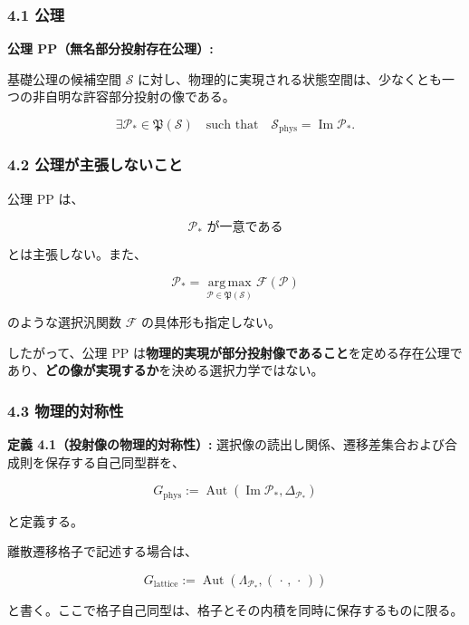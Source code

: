 \documentclass[
  a4paper,
  ja=minimal,
  xelatex,
  paragraph-mark={},
]{bxjsarticle}
\begin{document}
\subsubsection{4.1 公理}\label{ux516cux7406}

\textbf{公理 PP（無名部分投射存在公理）:}

基礎公理の候補空間 \(\mathscr S\)
に対し、物理的に実現される状態空間は、少なくとも一つの非自明な許容部分投射の像である。

\[
\boxed{
\exists\mathcal P_*
\in
\mathfrak P(\mathscr S)
\quad\text{such that}\quad
\mathscr S_{\mathrm{phys}}
{}=
\operatorname{Im}\mathcal P_*.
}
\]

\subsubsection{4.2
公理が主張しないこと}\label{ux516cux7406ux304cux4e3bux5f35ux3057ux306aux3044ux3053ux3068}

公理 PP は、

\[
\mathcal P_*
\text{ が一意である}
\]

とは主張しない。また、

\[
\mathcal P_*
{}=
\operatorname*{arg\,max}_{\mathcal P\in\mathfrak P(\mathscr S)}
\mathcal F(\mathcal P)
\]

のような選択汎関数 \(\mathcal F\) の具体形も指定しない。

したがって、公理 PP
は\textbf{物理的実現が部分投射像であること}を定める存在公理であり、\textbf{どの像が実現するか}を決める選択力学ではない。

\subsubsection{4.3
物理的対称性}\label{ux7269ux7406ux7684ux5bfeux79f0ux6027}

\textbf{定義 4.1（投射像の物理的対称性）:}
選択像の読出し関係、遷移差集合および合成則を保存する自己同型群を、

\[
G_{\mathrm{phys}}
:=
\operatorname{Aut}
\left(
\operatorname{Im}\mathcal P_*,
\Delta_{\mathcal P_*}
\right)
\]

と定義する。

離散遷移格子で記述する場合は、

\[
G_{\mathrm{lattice}}
:=
\operatorname{Aut}
\left(
\Lambda_{\mathcal P_*},
(\,\cdot\,,\,\cdot\,)
\right)
\]

と書く。ここで格子自己同型は、格子とその内積を同時に保存するものに限る。
\end{document}
